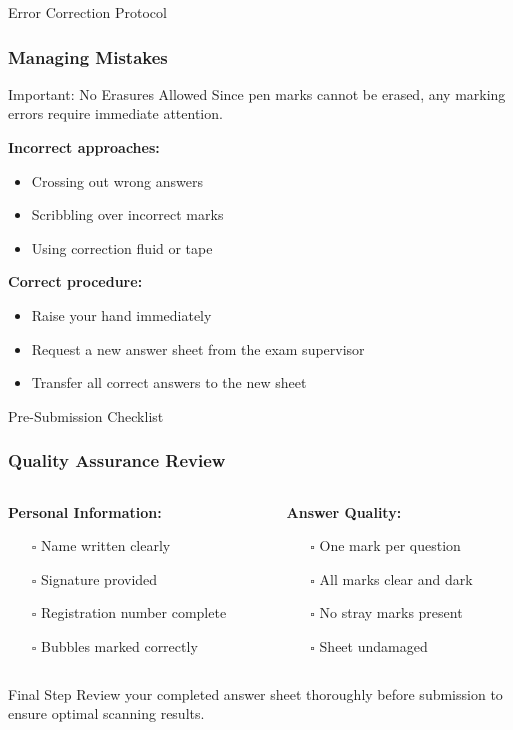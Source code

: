 \documentclass{beamer}
\begin{document}
\begin{frame}{Error Correction Protocol}
\frametitle{Managing Mistakes}
\begin{block}{Important: No Erasures Allowed}
Since pen marks cannot be erased, any marking errors require immediate attention.
\end{block}

\textbf{Incorrect approaches:}
\begin{itemize}
\item Crossing out wrong answers
\item Scribbling over incorrect marks  
\item Using correction fluid or tape
\end{itemize}

\textbf{Correct procedure:}
\begin{itemize}
\item Raise your hand immediately
\item Request a new answer sheet from the exam supervisor
\item Transfer all correct answers to the new sheet
\end{itemize}
\end{frame}

\begin{frame}{Pre-Submission Checklist}
\frametitle{Quality Assurance Review}
\begin{columns}
\begin{column}{0.5\textwidth}
\textbf{Personal Information:}
\begin{itemize}
\item[$\square$] Name written clearly
\item[$\square$] Signature provided
\item[$\square$] Registration number complete
\item[$\square$] Bubbles marked correctly
\end{itemize}
\end{column}

\begin{column}{0.5\textwidth}
\textbf{Answer Quality:}
\begin{itemize}
\item[$\square$] One mark per question
\item[$\square$] All marks clear and dark
\item[$\square$] No stray marks present
\item[$\square$] Sheet undamaged
\end{itemize}
\end{column}
\end{columns}

\begin{block}{Final Step}
Review your completed answer sheet thoroughly before submission to ensure optimal scanning results.
\end{block}
\end{frame}
\end{document}
